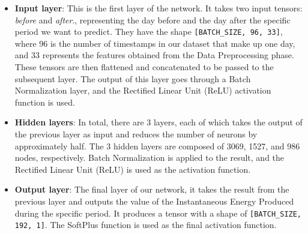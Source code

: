 \begin{itemize}
	\item \textbf{Input layer}: This is the first layer of the network.
	      It takes two input tensors: \textit{before} and \textit{after}., representing the day before and the day after the specific period we want to
	      predict. They have the shape \verb|[BATCH_SIZE, 96, 33]|, where 96 is the number
	      of timestamps in our dataset that make up one day, and 33 represents the
	      features obtained from the Data Preprocessing phase.
	      These tensors are then flattened and concatenated to be passed to the subsequent layer.
	      The output of this layer goes through a Batch Normalization\cite{batchnorm} layer, and the
	      Rectified Linear Unit (ReLU)\cite{functions} activation function is used.


	\item \textbf{Hidden layers}: In total, there are 3 layers, each of which takes the
	      output of the previous layer as input and reduces the number of neurons by approximately half. The 3 hidden layers are composed of 3069, 1527, and 986 nodes, respectively.
	      Batch Normalization\cite{batchnorm} is applied to the result, and the Rectified Linear Unit (ReLU)\cite{functions}
	      is used as the activation function.

	\item \textbf{Output layer}: The final layer of our network, it takes the result from the
	      previous layer and outputs the value of the Instantaneous Energy Produced
	      during the specific period.
	      It produces a tensor with a shape of \verb|[BATCH_SIZE, 192, 1]|.
	      The SoftPlus\cite{functions} function is used as the final activation function.

\end{itemize}

